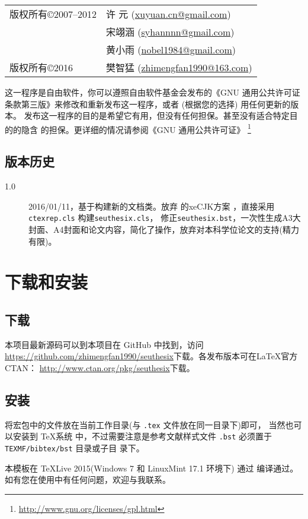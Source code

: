 ﻿\documentclass[figurelist,tablelist,algorithmlist,nomlist,masters]{seuthesix}
\begin{document}
\begin{tabular}{ll}
版权所有\copyright 2007--2012 & 许 元 (\url{xuyuan.cn@gmail.com})\\
 &宋翊涵 (\url{syhannnn@gmail.com})\\
 & 黄小雨 (\url{nobel1984@gmail.com})\\
 版权所有\copyright 2016 & 樊智猛 (\url{zhimengfan1990@163.com})
\end{tabular}
\par
这一程序是自由软件，你可以遵照自由软件基金会发布的《GNU 通用公共许可证
条款第三版》来修改和重新发布这一程序，或者 (根据您的选择) 用任何更新的版本。
发布这一程序的目的是希望它有用，但没有任何担保。甚至没有适合特定目的的隐含
的担保。更详细的情况请参阅《GNU 通用公共许可证》
\footnote{\url{http://www.gnu.org/licenses/gpl.html}}

\section{版本历史}
\begin{description}
\item[1.0] 2016/01/11，基于\seuthesis 构建新的\seuthesix 文档类。放弃\seuthesis 
的xeCJK方案 ，直接采用\verb+ctexrep.cls+ 构建\verb+seuthesix.cls+，
修正\verb+seuthesix.bst+，一次性生成A3大封面、A4封面和论文内容，简化了操作，放弃对本科学位论文的支持(精力有限)。
\end{description}

\chapter{下载和安装}
\section{下载}
本项目最新源码可以到本项目在 GitHub 中找到，访问
 \url{https://github.com/zhimengfan1990/seuthesix}下载。各发布版本可在\LaTeX 官方 CTAN： 
 \url{http://www.ctan.org/pkg/seuthesix}下载。
\section{安装}
将宏包中的文件放在当前工作目录(与 \verb+.tex+ 文件放在同一目录下)即可，
当然也可以安装到 \TeX 系统
中，不过需要注意是参考文献样式文件 \verb+.bst+ 必须置于 \verb+TEXMF/bibtex/bst+ 目录或子目
录下。

本模板在 \TeX{Live} 2015(Windows 7 和 LinuxMint 17.1 环境下) 通过 编译通过。
如有您在使用中有任何问题，欢迎与我联系。
\end{document}
